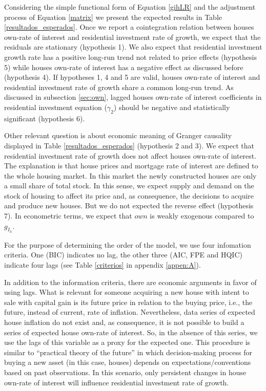 \documentclass[12pt, a4paper]{article}
\begin{document}
Considering the simple functional form of Equation \ref{gihLR} and the adjustment process of Equation \ref{matrix} we present the expected results in Table \ref{resultados_esperados}.
Once we report a cointegration relation between houses own-rate of interest and residential investment rate of growth, we expect that the residuals are stationary (hypothesis 1).
We also expect that residential investment growth rate has a positive long-run trend not related to price effects (hypothesis 5) while houses own-rate of interest has a negative effect as discussed before (hypothesis 4).
If  hypotheses 1, 4 and 5 are valid, houses own-rate of interest and residential investment rate of growth share a common long-run trend.
As discussed in subsection \ref{sec:own}, lagged houses own-rate of interest coefficients in residential investment equation (\(\gamma_{2}\)) should be negative and statistically significant (hypothesis 6).






Other relevant question is about economic meaning of Granger causality displayed in Table \ref{resultados_esperados} (hypothesis 2 and 3).
We expect that residential investment rate of growth does not affect  houses own-rate of interest.
The explanation is that house prices and mortgage rate of interest are defined to the whole housing market.
In this market the newly constructed houses are only a small share of total stock.
In this sense, we expect supply and demand on the stock of housing to affect its price and, as consequence,  the decisions to acquire and produce new houses.
But we do not expected the reverse effect (hypothesis 7).
In econometric terms, we expect that \(own\) is weakly exogenous compared to \(g_{I_{h}}\).

For the purpose of determining the order of the model, we use four infomation criteria.
One (BIC) indicates no lag, the other three (AIC, FPE and HQIC) indicate four lags (see Table \ref{criterios} in appendix \ref{appen:A}).

In addition to the information criteria, there are economic arguments in favor of using lags.
What is relevant for someone acquiring a new house with intent to sale with capital gain is its future price in relation to the buying price, i.e., the future, instead of current, rate of inflation.
Nevertheless, data series of expected house inflation do not exist and, as consequence, it is not possible to build a series of expected house own-rate of interest.
So, in the absence of this series, we use the lags of this variable as a proxy for the expected one.
This procedure is similar to \textcite{keynes_general_1937}  ``practical theory of the future'' in which decision-making process for buying a new asset (in this case, houses) depends on expectations/conventions based on past observations.
In this scenario, only persistent changes in house own-rate of interest will influence residential investment rate of growth.
\end{document}
